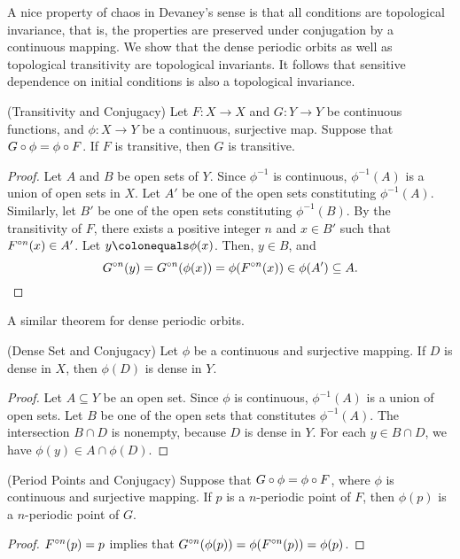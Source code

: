 \documentclass[12pt,draft,twoside]{book}
\begin{document}
  A nice property of chaos in Devaney's sense is that all conditions are topological invariance, that is, the properties are preserved under conjugation by a continuous mapping.
  We show that the dense periodic orbits as well as topological transitivity are topological invariants.
  It follows that sensitive dependence on initial conditions is also a topological invariance.
  \begin{theorem}
    (Transitivity and Conjugacy) 
    Let $F: X \to X$ and $G: Y \to Y$ be continuous functions, and $\phi: X \to Y$ be a continuous, surjective map.
    Suppose that $G \circ \phi = \phi \circ F$.
    If $F$ is transitive, then $G$ is transitive.
    \label{thm:conj-trans}
    \begin{proof}
      Let $A$ and $B$ be open sets of $Y$.
      Since $\phi^{-1}$ is continuous, $\phi^{-1}(A)$ is a union of open sets in $X$.
      Let $A'$ be one of the open sets constituting $\phi^{-1}(A)$.
      Similarly, let $B'$ be one of the open sets constituting $\phi^{-1}(B)$.
      By the transitivity of $F$, there exists a positive integer $n$ and $x \in B'$ such that $F^{\circ n}(x)\in A'$.
      Let $y \ceq \phi(x)$.
      Then, $y \in B$, and 
      \begin{equation*}
        G^{\circ n}(y) 
        = G^{\circ n}(\phi(x))
        = \phi(F^{\circ n}(x)) \in \phi(A') \subseteq A.
      \end{equation*}
      \end{proof}
  \end{theorem}
  A similar theorem for dense periodic orbits.
  \begin{theorem}
    (Dense Set and Conjugacy) 
    Let $\phi$ be a continuous and surjective mapping.
    If $D$ is dense in $X$, then $\phi(D)$ is dense in $Y$.
    \label{thm:conj-dense}
    \begin{proof}
      Let $A \subseteq Y$ be an open set.
      Since $\phi$ is continuous, $\phi^{-1} (A)$ is a union of open sets.
      Let $B$ be one of the open sets that constitutes $\phi^{-1}(A)$.
      The intersection $B \cap D$ is nonempty, because $D$ is dense in $Y$.
      For each $y \in B \cap D$, we have $\phi(y) \in A \cap \phi(D)$.
    \end{proof}
  \end{theorem}
  \begin{theorem}
    (Period Points and Conjugacy)
    Suppose that $G \circ \phi = \phi \circ F$, where $\phi$ is continuous and surjective mapping.
    If $p$ is a $n$-periodic point of $F$, then $\phi(p)$ is a $n$-periodic point of $G$.
    \label{thm:conj-per}
    \begin{proof}
      $F^{\circ n}(p) = p$ implies that $G^{\circ n}(\phi(p)) = \phi(F^{\circ n}(p)) = \phi(p)$.
    \end{proof}
  \end{theorem}
\end{document}
